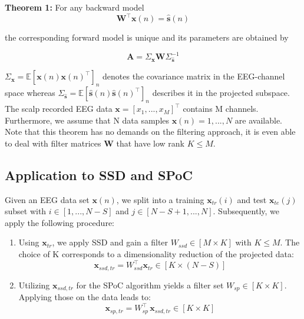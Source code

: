 \documentclass[11pt,a4paper]{article}
\renewcommand{\vec}[1]{\mathbf{#1}}
\begin{document}
\textbf {Theorem 1:} For any backward model 
\begin{equation}\label{eq:bw_model}
\vec{W}^\top \vec{x}(n) = \hat{\vec{s}}(n)
\end{equation}

the corresponding forward model is unique and its parameters are obtained by

\begin{equation}\label{eq:fw_pattern}
\vec{A} = \Sigma_{\vec{x}} \vec{W} \Sigma_{\hat{\vec{s}}}^{-1} 
\end{equation}

$\Sigma_{\vec{x}}=\mathbb{E}[\vec{x}(n) \vec{x}(n)^\top]_{n}$ denotes the covariance matrix in the EEG-channel space whereas $\Sigma_{\hat{\vec{s}}}=\mathbb{E}[\hat{\vec{s}}(n) \hat{\vec{s}}(n)^\top]_{n}$ describes it in the projected subspace. The scalp recorded EEG data $\vec{x} = [x_{1},...,x_{M}]^\top$ contains M channels. Furthermore, we assume that N data samples $\vec{x}(n) = 1,...,N$ are available. Note that this theorem has no demands on the filtering approach, it is even able to deal with filter matrices $\vec{W}$ that have low rank $K \leq M$. 


\subsection*{Application to SSD and SPoC}

Given an EEG data set $\vec{x}(n)$, we split into a training $\vec{x}_{tr}(i)$ and test $\vec{x}_{te}(j)$  subset with $i \in [1,...,N-S]$ and $j \in [N-S+1,...,N]$. Subsequently, we apply the following procedure:
\begin{enumerate}

\item Using $\vec{x}_{tr}$, we apply SSD and gain a filter $W_{ssd} \in [M \times K]$ with $K \leq M$. The choice of K corresponds to a dimensionality reduction of the projected data:
\begin{equation}\label{eq:bw_ssd}
\vec{x}_{ssd,tr} = W_{ssd}^\top \vec{x}_{tr} \in [K \times (N-S)]
\end{equation}
\item Utilizing $\vec{x}_{ssd,tr}$ for the SPoC algorithm yields a filter set $W_{sp} \in [K \times K]$. Applying those on the data leads to: 
\begin{equation}\label{eq:bw_spoc}
\vec{x}_{sp,tr} = W_{sp}^\top \, \vec{x}_{ssd,tr} \in [K \times K]
\end{equation}

\end{enumerate}
\end{document}

